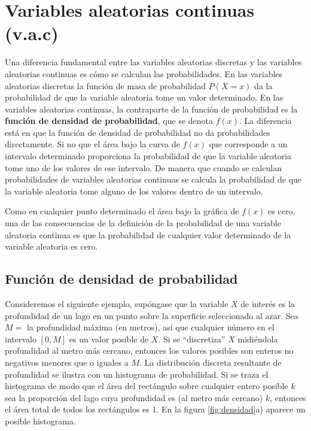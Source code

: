 \documentclass[
  11pt,
]{book}
\theoremstyle{definition}
\theoremstyle{definition}
\theoremstyle{definition}
\theoremstyle{definition}
\theoremstyle{remark}
\begin{document}
\section{Variables aleatorias continuas (v.a.c)}\label{probabilidad-variable-aleatoria-continua}

Una diferencia fundamental entre las variables aleatorias discretas y las variables aleatorias continuas es cómo se calculan las probabilidades. En las variables aleatorias discretas la función de masa de probabilidad \(P(X=x)\) da la probabilidad de que la variable aleatoria tome un valor determinado. En las variables aleatorias continuas, la contraparte de la función de probabilidad es la \textbf{función de densidad de probabilidad}, que se denota \(f(x)\). La diferencia está en que la función de densidad de probabilidad no da probabilidades directamente. Si no que el área bajo la curva de \(f(x)\) que corresponde a un intervalo determinado proporciona la probabilidad de que la variable aleatoria tome uno de los valores de ese intervalo. De manera que cuando se calculan probabilidades de variables aleatorias continuas se calcula la probabilidad de que la variable aleatoria tome alguno de los valores dentro de un intervalo.

Como en cualquier punto determinado el área bajo la gráfica de \(f(x)\) es cero, una de las consecuencias de la definición de la probabilidad de una variable aleatoria continua es que la probabilidad de cualquier valor determinado de la variable aleatoria es cero. \citep[página 227]{anderson}

\subsection{Función de densidad de probabilidad}\label{probabilidad-variable-aleatoria-continua-fdp}

Consideremos el siguiente ejemplo, supóngase que la variable \(X\) de interés es la profundidad de un lago en un punto sobre la superficie seleccionado al azar. Sea \(M =\) la profundidad máxima (en metros), así que cualquier número en el intervalo \([0, M]\) es un valor posible de \(X\). Si se ``discretiza'' \(X\) midiéndola profundidad al metro más cercano, entonces los valores posibles son enteros no negativos menores que o iguales a \(M\). La distribución discreta resultante de profundidad se ilustra con un histograma de probabilidad. Si se traza el histograma de modo que el área del rectángulo sobre cualquier entero posible \(k\) sea la proporción del lago cuya profundidad es (al metro más cercano) \(k\), entonces el área total de todos los rectángulos es 1. En la figura \ref{fig:densidad}a) aparece un posible histograma.
\end{document}
